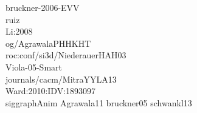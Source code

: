 %
%
%
%
bruckner-2006-EVV\cite{proc:bruckner-2006-EVV}\\
ruiz \cite{proc:ruiz-2008-SEV} \\
Li:2008\cite{proc:Li:2008:AGI} \\
og/AgrawalaPHHKHT\cite{journals/tog/AgrawalaPHHKHT03}\\
roc:conf/si3d/NiederauerHAH03\cite{proc:conf/si3d/NiederauerHAH03}\\
Viola-05-Smart\cite{Viola:2005:SVV:2381219.2381249}\\
journals/cacm/MitraYYLA13\cite{journals/cacm/MitraYYLA13}\\
Ward:2010:IDV:1893097\cite{Ward:2010:IDV:1893097}\\
siggraphAnim\cite{misc:siggraphAnim}
Agrawala11\cite{Agrawala:2011:DPV:1924421.1924439}
bruckner05\cite{bruckner-2005-VIS}
schwankl13\cite{schwankl-2013-smis}
